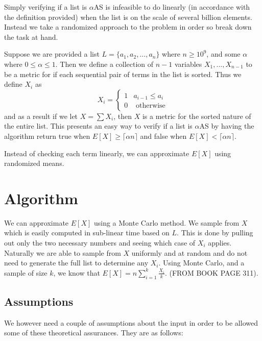 \documentclass[11pt]{article}
\begin{document}
Simply verifying if a list is $\alpha$AS is infeasible to do linearly (in accordance with the definition provided) when the list is on the scale of several billion elements. Instead we take a randomized approach to the problem in order so break down the task at hand. 

Suppose we are provided a list $L = \{a_1, a_2, ..., a_n\}$ where $n \geq 10^9$, and some $\alpha$ where $0 \leq \alpha \leq 1$. Then we define a collection of $n-1$ variables $X_1, ..., X_{n-1}$ to be a metric for if each sequential pair of terms in the list is sorted. Thus we define $X_i$ as
$$X_i = 
\begin{cases}
	1 & a_{i-1} \leq a_i \\
	0 & \text{ otherwise}
\end{cases}$$
and as a result if we let $X = \sum X_i$, then $X$ is a metric for the sorted nature of the entire list. This presents an easy way to verify if a list is $\alpha$AS by having the algorithm return true when $E[X] \geq \lceil \alpha n \rceil$ and false when $E[X] < \lceil \alpha n \rceil$.

Instead of checking each term linearly, we can approximate $E[X]$ using randomized means. 

\section{Algorithm}

We can approximate $E[X]$ using a Monte Carlo method. We sample from $X$ which is easily computed in sub-linear time based on $L$. This is done by pulling out only the two necessary numbers and seeing which case of $X_i$ applies. Naturally we are able to sample from $X$ uniformly and at random and do not need to generate the full list to determine any $X_i$. Using Monte Carlo, and a sample of size $k$, we know that $E[X] = n \sum\limits^k_{i=1} \frac{X_i}{k}$. (FROM BOOK PAGE 311). 

\subsection{Assumptions}

We however need a couple of assumptions about the input in order to be allowed some of these theoretical assurances. They are as follows:
\end{document}
